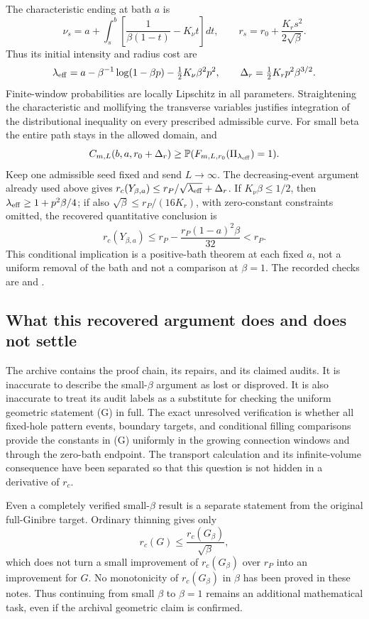 \documentclass[11pt,a4paper]{article}
\theoremstyle{definition}
\theoremstyle{remark}
\numberwithin{equation}{section}
\begin{document}
The characteristic ending at bath $a$ is
\[
 \nu_s=a+\int_s^b\left[\frac1{\beta(1-t)}-K_\nu t\right]dt,
 \qquad r_s=r_0+\frac{K_rs^2}{2\sqrt\beta}.
\]
Thus its initial intensity and radius cost are
\[
 \lambda_{\rm eff}=a-\beta^{-1}\log(1-\beta p)
                    -\tfrac12K_\nu\beta^2p^2,\qquad
 \Delta_r=\tfrac12K_rp^2\beta^{3/2}.
\]
Finite-window probabilities are locally Lipschitz in all parameters.
Straightening the characteristic and mollifying the transverse
variables justifies integration of the distributional inequality on
every prescribed admissible curve. For small beta the entire path
stays in the allowed domain, and
\[
 C_{m,L}(b,a,r_0+\Delta_r)
       \ge \mathbb P(F_{m,L,r_0}(\Pi_{\lambda_{\rm eff}})=1).
\]
Keep one admissible seed fixed and send $L\to\infty$.
The decreasing-event argument already used above gives
$r_c(Y_{\beta,a})\le r_P/\sqrt{\lambda_{\rm eff}}+\Delta_r$.
If $K_\nu\beta\le1/2$, then
$\lambda_{\rm eff}\ge1+p^2\beta/4$; if also
$\sqrt\beta\le r_P/(16K_r)$, with zero-constant constraints omitted,
the recovered quantitative conclusion is
\begin{equation}\label{sb:mixed-strict}
 r_c(Y_{\beta,a})\le r_P-\frac{r_P(1-a)^2\beta}{32}<r_P.
\end{equation}
This conditional implication is a positive-bath theorem at each fixed
$a$, not a uniform removal of the bath and not a comparison at
$\beta=1$. The recorded checks are 
and .

\subsection{What this recovered argument does and does not settle}

The archive contains the proof chain, its repairs, and its claimed
audits. It is inaccurate to describe the small-$\beta$ argument as
lost or disproved. It is also inaccurate to treat its audit labels as
a substitute for checking the uniform geometric statement (G) in full.
The exact unresolved verification is whether all fixed-hole pattern
events, boundary targets, and conditional filling comparisons provide
the constants in (G) uniformly in the growing connection windows and
through the zero-bath endpoint. The transport calculation and its
infinite-volume consequence have been separated so that this question
is not hidden in a derivative of $r_c$.

Even a completely verified small-$\beta$ result is a separate statement
from the original full-Ginibre target. Ordinary thinning gives only
\[
 r_c(G)\le\frac{r_c(G_\beta)}{\sqrt\beta},
\]
which does not turn a small improvement of $r_c(G_\beta)$ over $r_P$
into an improvement for $G$. No monotonicity of $r_c(G_\beta)$ in
$\beta$ has been proved in these notes. Thus continuing from small
$\beta$ to $\beta=1$ remains an additional mathematical task, even if
the archival geometric claim is confirmed.
\end{document}
